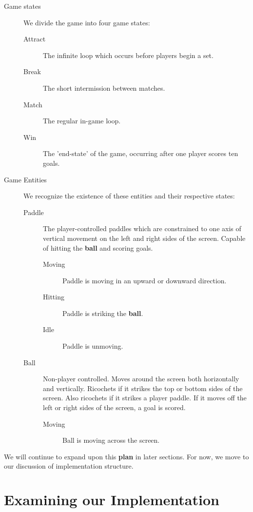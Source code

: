 \documentclass{report}
\newcommand{\state}[1]{\textbf{#1}}
\newcommand{\ball}{\textbf{ball}\xspace}
\begin{document}
\begin{description}
    \item[Game states] We divide the game into four game states:
    \begin{description}
        \item[Attract] The infinite loop which occurs before players begin a set.
        \item[Break] The short intermission between matches.
        \item[Match] The regular in-game loop.
        \item[Win]   The 'end-state' of the game, occurring after one player scores ten goals. 
    \end{description}
    \item[Game Entities] We recognize the existence of these entities and their respective states: 
    \begin{description}
        \item[Paddle] The player-controlled paddles which are constrained to one axis of vertical movement on the left and right sides of the screen. Capable of hitting the \ball and scoring goals.
        \begin{description}
            \item[Moving] Paddle is moving in an upward or downward direction.
            \item[Hitting] Paddle is striking the \ball.  
            \item[Idle] Paddle is unmoving. 
        \end{description} 
        \item[Ball] Non-player controlled. Moves around the screen both horizontally and vertically. Ricochets if it strikes the top or bottom sides of the screen. Also ricochets if it strikes a player paddle. If it moves off the left or right sides of the screen, a goal is scored. 
        \begin{description}
            \item[Moving] Ball is moving across the screen.
        \end{description}
    \end{description}
    \item[] 
\end{description}

We will continue to expand upon this \state{plan} in later sections. For now, we move to our discussion of implementation structure.

\section{Examining our Implementation}
\end{document}
